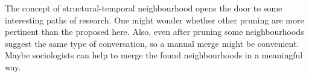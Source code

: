 \documentclass[conference]{IEEEtran}
\begin{document}
The concept of structural-temporal neighbourhood opens the door to some interesting paths of research. One might wonder whether other pruning are more pertinent than the proposed here. Also, even after pruning some neighbourhoods suggest the same type of conversation, so a manual merge might be convenient. Maybe sociologists can help to merge the found neighbourhoods in a meaningful way.   
 





%


\end{document}
